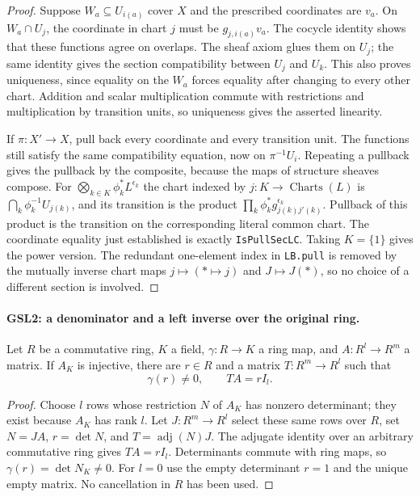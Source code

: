 \documentclass[11pt,a4paper]{article}
\numberwithin{equation}{section}
\theoremstyle{remark}\newtheorem{remark}[theorem]{Remark}
\begin{document}
\begin{proof}
Suppose $W_a\subseteq U_{i(a)}$ cover $X$ and the prescribed coordinates
are $v_a$.  On $W_a\cap U_j$, the coordinate in chart $j$ must be
$g_{j,i(a)}v_a$.  The cocycle identity shows that these functions agree
on overlaps.  The sheaf axiom glues them on $U_j$; the same identity gives
the section compatibility between $U_j$ and $U_k$.  This also proves
uniqueness, since equality on the $W_a$ forces equality after changing
to every other chart.  Addition and scalar multiplication commute with
restrictions and multiplication by transition units, so uniqueness gives
the asserted linearity.

If $\pi:X'\to X$, pull back every coordinate and every transition unit.
The functions still satisfy the same compatibility equation, now on
$\pi^{-1}U_i$.  Repeating a pullback gives the pullback by the composite,
because the maps of structure sheaves compose.  For
$\bigotimes_{k\in K}\phi_k^*L^{\epsilon_k}$ the chart indexed by
$j:K\to\operatorname{Charts}(L)$ is
$\bigcap_k\phi_k^{-1}U_{j(k)}$, and its transition is the product
$\prod_k\phi_k^*g_{j(k)j'(k)}^{\epsilon_k}$.  Pullback of this
product is the transition on the corresponding literal common chart.
The coordinate equality just established is exactly
\texttt{Is\allowbreak Pull\allowbreak Sec\allowbreak LC}.  Taking $K=\{1\}$ gives the power version.
The redundant one-element index in \texttt{LB.\allowbreak pull} is removed by the
mutually inverse chart maps $j\mapsto(\ast\mapsto j)$ and
$J\mapsto J(\ast)$, so no choice of a different section is involved.
\end{proof}

\paragraph{GSL2: a denominator and a left inverse over the original ring.}
\label{claim:GSL2}
Let $R$ be a commutative ring, $K$ a field, $\gamma:R\to K$ a ring
map, and $A:R^l\to R^m$ a matrix.  If $A_K$ is injective, there are
$r\in R$ and a matrix $T:R^m\to R^l$ such that
\[
 \gamma(r)\ne0,\qquad TA=rI_l. \tag{GSL.1}
\]

\begin{proof}
Choose $l$ rows whose restriction $N$ of $A_K$ has nonzero determinant;
they exist because $A_K$ has rank $l$.  Let $J:R^m\to R^l$ select
these same rows over $R$, set $N=JA$, $r=\det N$, and
$T=\operatorname{adj}(N)J$.  The adjugate identity over an arbitrary
commutative ring gives $TA=rI_l$.  Determinants commute with ring maps,
so $\gamma(r)=\det N_K\ne0$.  For $l=0$ use the empty determinant
$r=1$ and the unique empty matrix.  No cancellation in $R$ has been used.
\end{proof}
\end{document}
